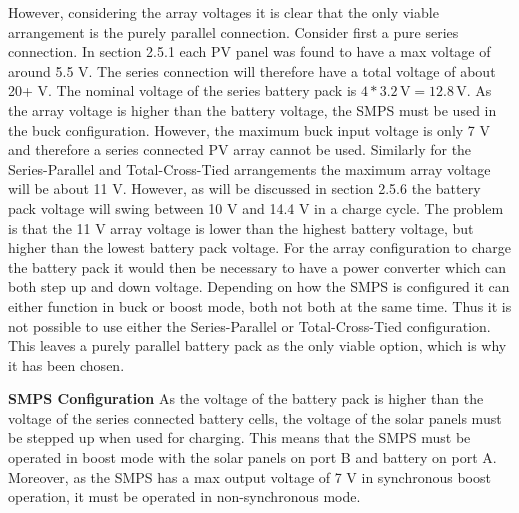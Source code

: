 \documentclass[a4paper]{article}
\newcommand{\unit}[1]{\ensuremath{\, \mathrm{#1}}}
\begin{document}
However, considering the array voltages it is clear that the only viable arrangement 
is the purely parallel connection. Consider first a pure series connection. In 
section 2.5.1 each PV panel was found to have a max voltage of around 5.5 V. 
The series connection will therefore have a total voltage of about 20+ V. 
The nominal voltage of the series battery pack is \(4 * 3.2 \unit{V} = 12.8 \unit{V} \). 
As the array voltage is higher than the battery voltage, the SMPS must 
be used in the buck configuration. However, the maximum buck input voltage 
is only 7 V\cite{PMOS} and therefore a series connected PV array 
cannot be used. Similarly for the Series-Parallel and Total-Cross-Tied 
arrangements the maximum array voltage will be about 11 V. However, 
as will be discussed in section 2.5.6 the battery pack voltage will 
swing between 10 V and 14.4 V in a charge cycle. The problem is that 
the 11 V array voltage is lower than the highest battery voltage, but
    higher than the lowest battery pack voltage. For the array configuration
to charge the battery pack it would then be necessary to have a power
converter which can both step up and down voltage. Depending on how the 
SMPS is configured it can either function in buck or boost mode, both not 
both at the same time. Thus it is not possible to use either the Series-Parallel
or Total-Cross-Tied configuration. This leaves a purely parallel battery 
pack as the only viable option, which is why it has been chosen. 


\textbf{SMPS Configuration}
\vspace{10pt} 
\newline
As the voltage of the battery pack is higher than the voltage of the series 
connected battery cells, the voltage of the solar panels must be stepped up 
when used for charging. This means that the SMPS must be operated in boost 
mode with the solar panels on port B and battery on port A. Moreover, as the 
SMPS has a max output voltage of 7 V in synchronous boost operation\cite{powerLogbook}, 
it must be operated in non-synchronous mode.
\end{document}
